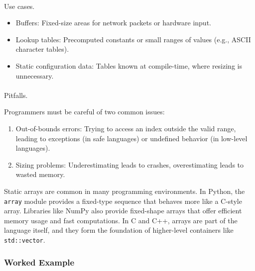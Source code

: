 \documentclass[
  letterpaper,
  DIV=11,
  numbers=noendperiod]{scrreprt}
\makeatletter
\let\oldparagraph\paragraph
\renewcommand{\paragraph}{
    \@ifstar
      \xxxParagraphStar
      \xxxParagraphNoStar
  }
\newcommand{\xxxParagraphStar}[1]{\oldparagraph*{#1}\mbox{}}
\newcommand{\xxxParagraphNoStar}[1]{\oldparagraph{#1}\mbox{}}
\providecommand{\tightlist}{%
  \setlength{\itemsep}{0pt}\setlength{\parskip}{0pt}}
\makeatother
\begin{document}
\paragraph{Use cases.}\label{use-cases.}

\begin{itemize}
\tightlist
\item
  Buffers: Fixed-size areas for network packets or hardware input.
\item
  Lookup tables: Precomputed constants or small ranges of values (e.g.,
  ASCII character tables).
\item
  Static configuration data: Tables known at compile-time, where
  resizing is unnecessary.
\end{itemize}

\paragraph{Pitfalls.}\label{pitfalls.}

Programmers must be careful of two common issues:

\begin{enumerate}
\def\labelenumi{\arabic{enumi}.}
\tightlist
\item
  Out-of-bounds errors: Trying to access an index outside the valid
  range, leading to exceptions (in safe languages) or undefined behavior
  (in low-level languages).
\item
  Sizing problems: Underestimating leads to crashes, overestimating
  leads to wasted memory.
\end{enumerate}

Static arrays are common in many programming environments. In Python,
the \texttt{array} module provides a fixed-type sequence that behaves
more like a C-style array. Libraries like NumPy also provide fixed-shape
arrays that offer efficient memory usage and fast computations. In C and
C++, arrays are part of the language itself, and they form the
foundation of higher-level containers like \texttt{std::vector}.

\subsubsection{Worked Example}\label{worked-example-1}
\end{document}
